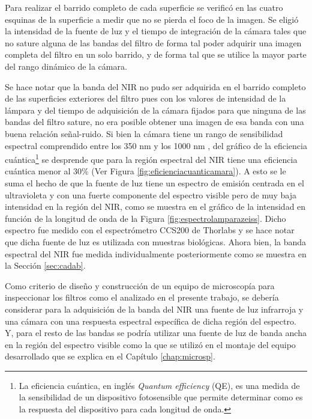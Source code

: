 Para realizar el barrido completo de cada superficie se verificó en las cuatro esquinas de la superficie a medir que no se pierda el foco de la imagen. Se eligió la intensidad de la fuente de luz y el tiempo de integración de la cámara tales que no sature alguna de las bandas del filtro de forma tal poder adquirir una imagen completa del filtro en un solo barrido, y de forma tal que se utilice la mayor parte del rango dinámico de la cámara.

Se hace notar que la banda del NIR no pudo ser adquirida en el barrido completo de las superficies exteriores del filtro pues con los valores de intensidad de la lámpara y del tiempo de adquisición de la cámara fijados para que ninguna de las bandas del filtro sature, no era posible obtener una imagen de esa banda con una buena relación señal-ruido. Si bien la cámara tiene un rango de sensibilidad espectral comprendido entre los 350 nm y los 1000 nm \cite{axiozeiss}, del gráfico de la eficiencia cuántica\footnote{La eficiencia cuántica, en inglés \textit{Quantum efficiency} (QE), es una medida de la sensibilidad de un dispositivo fotosensible que permite determinar como es la respuesta del dispositivo para cada longitud de onda.} se desprende que para la región espectral del NIR tiene una eficiencia cuántica menor al 30\% (Ver Figura \ref{fig:eficienciacuanticamara}). A esto se le suma el hecho de que la fuente de luz tiene un espectro de emisión centrada en el ultravioleta y con una fuerte componente del espectro visible pero de muy baja intensidad en la región del NIR, como se muestra en el gráfico de la intensidad en función de la longitud de onda de la Figura \ref{fig:espectrolamparazeiss}. Dicho espectro fue medido con el espectrómetro CCS200 de Thorlabs y se hace notar que dicha fuente de luz es utilizada con muestras biológicas. Ahora bien, la banda espectral del NIR fue medida individualmente posteriormente como se muestra en la Sección \ref{sec:cadab}.

Como criterio de diseño y construcción de un equipo de microscopía para inspeccionar los filtros como el analizado en el presente trabajo, se debería considerar para la adquisición de la banda del NIR una fuente de luz infrarroja y una cámara con una respuesta espectral específica de dicha región del espectro. Y, para el resto de las bandas se podría utilizar una fuente de luz de banda ancha en la región del espectro visible como la que se utilizó en el montaje del equipo desarrollado que se explica en el Capítulo \ref{chap:microsp}.


